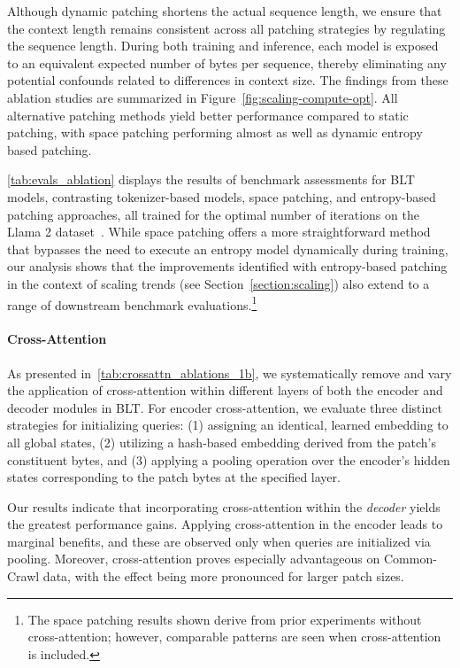 Although dynamic patching shortens the actual sequence length, we ensure that the context length remains consistent across all patching strategies by regulating the sequence length. During both training and inference, each model is exposed to an equivalent expected number of bytes per sequence, thereby eliminating any potential confounds related to differences in context size. The findings from these ablation studies are summarized in Figure~\ref{fig:scaling-compute-opt}. All alternative patching methods yield better performance compared to static patching, with space patching performing almost as well as dynamic entropy based patching.

\autoref{tab:evals_ablation} displays the results of benchmark assessments for {\textsc BLT} models, contrasting tokenizer-based models, space patching, and entropy-based patching approaches, all trained for the optimal number of iterations on the Llama 2 dataset~\citep{dubey2024llama}. While space patching offers a more straightforward method that bypasses the need to execute an entropy model dynamically during training, our analysis shows that the improvements identified with entropy-based patching in the context of scaling trends (see Section~\ref{section:scaling}) also extend to a range of downstream benchmark evaluations.\footnote{The space patching results shown derive from prior experiments without cross-attention; however, comparable patterns are seen when cross-attention is included.}

\paragraph{Cross-Attention} 
As presented in~\autoref{tab:crossattn_ablations_1b}, we systematically remove and vary the application of cross-attention within different layers of both the encoder and decoder modules in {\textsc BLT}. For encoder cross-attention, we evaluate three distinct strategies for initializing queries: (1) assigning an identical, learned embedding to all global states, (2) utilizing a hash-based embedding derived from the patch’s constituent bytes, and (3) applying a pooling operation over the encoder's hidden states corresponding to the patch bytes at the specified layer.

Our results indicate that incorporating cross-attention within the \textit{decoder} yields the greatest performance gains. Applying cross-attention in the encoder leads to marginal benefits, and these are observed only when queries are initialized via pooling. Moreover, cross-attention proves especially advantageous on Common-Crawl data, with the effect being more pronounced for larger patch sizes.

